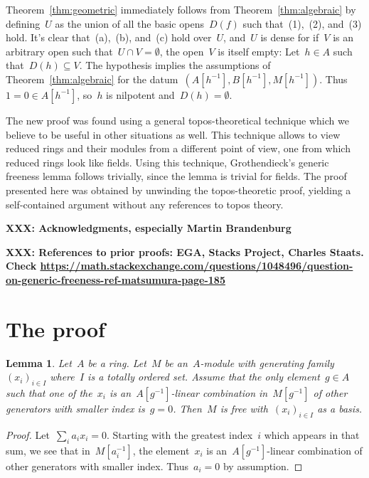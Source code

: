 \documentclass{amsart}
\theoremstyle{definition}
\theoremstyle{plain}
\newtheorem{lemma}[defn]{Lemma}
\theoremstyle{remark}
\newcommand{\XXX}[1]{\textbf{XXX: #1}}
\begin{document}
Theorem~\ref{thm:geometric} immediately follows from
Theorem~\ref{thm:algebraic} by defining~$U$ as the union of all the basic
opens~$D(f)$ such that~(1),~(2), and~(3) hold. It's clear that~(a),~(b),
and~(c) hold over~$U$, and~$U$ is dense for if~$V$ is an arbitrary open
such that~$U \cap V = \emptyset$, the open~$V$ is itself empty: Let~$h \in A$
such that~$D(h) \subseteq V$. The hypothesis implies the assumptions of
Theorem~\ref{thm:algebraic} for the datum~$(A[h^{-1}], B[h^{-1}], M[h^{-1}])$.
Thus~$1 = 0 \in A[h^{-1}]$, so~$h$ is nilpotent and~$D(h) = \emptyset$.

The new proof was found using a general topos-theoretical technique which we
believe to be useful in other situations as well. This technique allows to view
reduced rings and their modules from a different point of view, one from which
reduced rings look like fields. Using this technique, Grothendieck's generic freeness
lemma follows trivially, since the lemma is trivial for fields. The proof
presented here was obtained by unwinding the topos-theoretic proof, yielding a
self-contained argument without any references to topos theory.

\XXX{Acknowledgments, especially Martin Brandenburg}

\XXX{References to prior proofs: EGA, Stacks Project, Charles Staats. Check
\url{https://math.stackexchange.com/questions/1048496/question-on-generic-freeness-ref-matsumura-page-185}}


\section{The proof}

\begin{lemma}\label{lemma:basis}
Let~$A$ be a ring. Let~$M$ be an~$A$-module with generating
family~$(x_i)_{i \in I}$ where~$I$ is a totally ordered set. Assume that the
only element~$g \in A$ such that one of the~$x_i$ is an~$A[g^{-1}]$-linear
combination in~$M[g^{-1}]$ of other generators with smaller index is~$g = 0$.
Then~$M$ is free with~$(x_i)_{i \in I}$ as a basis.
\end{lemma}

\begin{proof}Let~$\sum_i a_i x_i = 0$. Starting with the greatest
index~$i$ which appears in that sum, we see that in~$M[a_i^{-1}]$, the
element~$x_i$ is an~$A[g^{-1}]$-linear combination of other generators with
smaller index. Thus~$a_i = 0$ by assumption.\end{proof}
\end{document}
